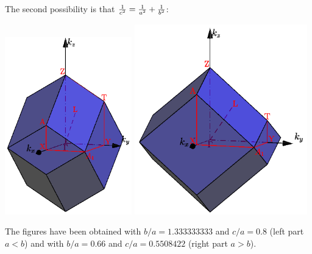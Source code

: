 \documentclass[12pt,a4paper]{article}
\begin{document}
The second possibility is that ${1\over c^2}={1\over a^2} + {1\over b^2}$:
\begin{center}
\includegraphics[width=5.5cm,angle=0]{images/ofc_17.png} \hspace{1cm}
\includegraphics[width=7.5cm,angle=0]{images/ofc_18.png} 
\end{center}
The figures have been obtained with $b/a=1.333333333$ and $c/a=0.8$ 
(left part $a<b$) and with $b/a=0.66$ and $c/a=0.5508422$ (right part
$a>b$).
\end{document}
